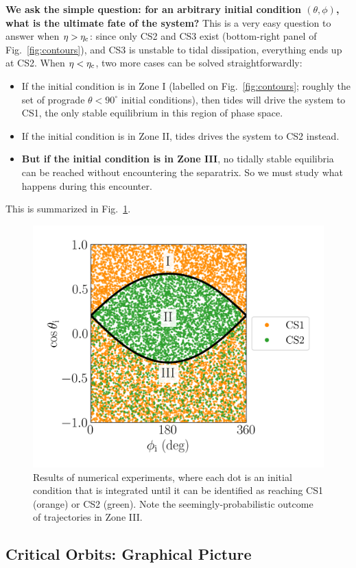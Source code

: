 \documentclass[11pt,
        usenames, %
        dvipsnames %
    ]{article}
\begin{document}
\textbf{We ask the simple question: for an arbitrary initial condition $(\theta,
\phi)$, what is the ultimate fate of the system?} This is a very easy question
to answer when $\eta > \eta_{\rm c}$: since only CS2 and CS3 exist (bottom-right
panel of Fig.~\ref{fig:contours}), and CS3 is unstable to tidal dissipation,
everything ends up at CS2. When $\eta < \eta_{\rm c}$, two more cases can be
solved straightforwardly:
\begin{itemize}
    \item If the initial condition is in Zone I (labelled on
        Fig.~\ref{fig:contours}; roughly the set of prograde $\theta < 90^\circ$
        initial conditions), then tides will drive the system to CS1, the only
        stable equilibrium in this region of phase space.

    \item If the initial condition is in Zone II, tides drives the system to CS2
        instead.

    \item \textbf{But if the initial condition is in Zone III}, no tidally
        stable equilibria can be reached without encountering the separatrix. So
        we must study what happens during this encounter.
\end{itemize}
This is summarized in Fig.~\ref{fig:outcomes}.
\begin{figure}
    \centering
    \includegraphics[width=0.5\columnwidth]{3stats3_5_0_2.png}
    \caption{Results of numerical experiments, where each dot is an initial
    condition that is integrated until it can be identified as reaching CS1
    (orange) or CS2 (green). Note the seemingly-probabilistic outcome of
    trajectories in Zone III.}\label{fig:outcomes}
\end{figure}

\subsection{Critical Orbits: Graphical Picture}
\end{document}
